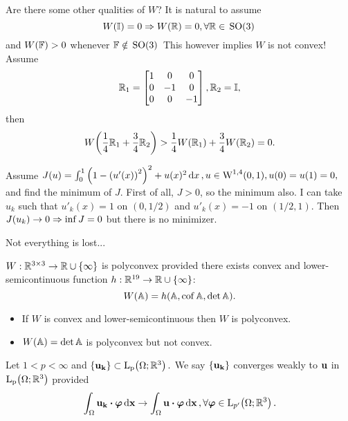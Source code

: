 \documentclass[11pt]{scrartcl} %
\begin{document}
Are there some other qualities of $W$? It is natural to assume
\[
	W\qty(\mathbb{I}) = 0 \Rightarrow W\qty(\mathbb{R})=0, \forall \mathbb{R}\in \, \text{SO(3)} \,
\]
and $W\qty(\mathbb{F})>0$ whenever $\mathbb{F} \notin \, \text{SO(3)} \,$
This however implies $W$ is not convex! Assume
\[
	\mathbb{R}_1 = \begin{bmatrix} 1 & 0 & 0\\ 0 & -1 & 0\\ 0 & 0 & -1 \end{bmatrix}, \mathbb{R}_2 = \mathbb{I},
\]
then
\[
	W\qty(\frac{1}{4}\mathbb{R}_1+\frac{3}{4}\mathbb{R}_2)>\frac{1}{4}W\qty(\mathbb{R}_1)+\frac{3}{4}W\qty(\mathbb{R}_2)=0.
\]

\begin{example}
Assume $J(u) = \int_{0}^1 \qty(1-\qty(u'(x))^{2})^{2}+u(x)^{2}\dd{x}, u \in \text{W}^{1,4}(0,1), u(0) = u(1) = 0,$ and find the minimum of $J$. First of all, $J>0$, so the minimum also. I can take $u_k$ such that $u'_k(x) = 1$ on $(0,1/2)$ and $u'_k(x) = -1$ on $(1/2,1)$. Then $J\qty(u_k)\to 0 \Rightarrow \inf J = 0$ but there is no minimizer.
\end{example}

Not everything is lost...

\begin{definition}
	$W: {\mathbb R}^{3 \times 3}\to {\mathbb R} \cup \{\infty\}$ is polyconvex provided there exists convex and lower-semicontinuous function $h: {\mathbb R}^{19}\to {\mathbb R} \cup \{\infty\}$:
\[
	W\qty(\mathbb{A})=h\qty(\mathbb{A}, \operatorname{cof} \mathbb{A}, \det \mathbb{A}).
\]
\end{definition}

\begin{example}
	\begin{itemize}
		\item	If $W$ is convex and lower-semicontinuous then $W$ is polyconvex. 
		\item	$W\qty(\mathbb{A}) = \det \mathbb{A}$ is polyconvex but not convex.
	\end{itemize}
\end{example}

\begin{remark}
	Let $1<p<\infty$ and $\{\vb{u_k}\} \subset \LpSet{\Omega; \R^3}.$ We say $\{\vb{u_k}\}$ converges weakly to $\vb{u}$ in $\LpSet{\Omega;\R^3}$ provided
	\[
		\int_{\Omega}\vb{u_k} \vdot \vb*{\varphi}\dd{\vb{x}} \to \int_{\Omega}\vb{u}\vdot \vb*{\varphi}\dd{\vb{x}}, \forall \vb*{\varphi} \in \LpSet[p']{\Omega;\R^3}.
	\]
\end{remark}
\end{document}
